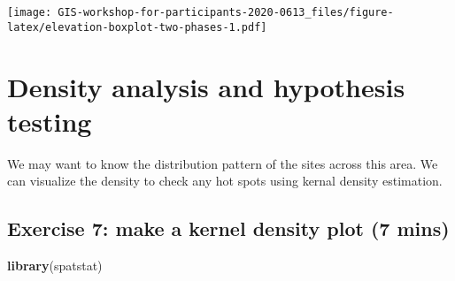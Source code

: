\documentclass[
  xelatex,ja=standard]{bxjsarticle}
\newenvironment{Shaded}{\begin{snugshade}}{\end{snugshade}}
\newcommand{\CommentTok}[1]{\textcolor[rgb]{0.56,0.35,0.01}{\textit{#1}}}
\newcommand{\DataTypeTok}[1]{\textcolor[rgb]{0.13,0.29,0.53}{#1}}
\newcommand{\KeywordTok}[1]{\textcolor[rgb]{0.13,0.29,0.53}{\textbf{#1}}}
\newcommand{\NormalTok}[1]{#1}
\newcommand{\OperatorTok}[1]{\textcolor[rgb]{0.81,0.36,0.00}{\textbf{#1}}}
\newcommand{\StringTok}[1]{\textcolor[rgb]{0.31,0.60,0.02}{#1}}
\begin{document}
\begin{Shaded}
\end{Shaded}

\texttt{[image: GIS-workshop-for-participants-2020-0613\_files/figure-latex/elevation-boxplot-two-phases-1.pdf]}

\hypertarget{density-analysis-and-hypothesis-testing}{%
\section{Density analysis and hypothesis
testing}\label{density-analysis-and-hypothesis-testing}}

We may want to know the distribution pattern of the sites across this
area. We can visualize the density to check any hot spots using kernal
density estimation.

\hypertarget{exercise-7-make-a-kernel-density-plot-7-mins}{%
\subsection{Exercise 7: make a kernel density plot (7
mins)}\label{exercise-7-make-a-kernel-density-plot-7-mins}}

\begin{Shaded}
\begin{Highlighting}[]
\KeywordTok{library}\NormalTok{(spatstat)}
\end{Highlighting}
\end{Shaded}
\end{document}
